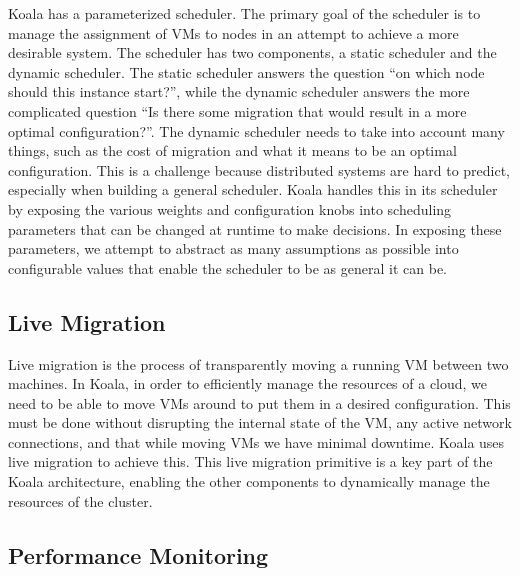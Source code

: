 

Koala has a parameterized scheduler.  The primary goal of the scheduler is to
manage the assignment of VMs to nodes in an attempt to achieve a more desirable
system.  The scheduler has two components, a static scheduler and the dynamic
scheduler.  The static scheduler answers the question ``on which node should
this instance start?'', while the dynamic scheduler answers the more
complicated question ``Is there some migration that would result in a more
optimal configuration?''.  The dynamic scheduler needs to take into account
many things, such as the cost of migration and what it means to be an optimal
configuration.  This is a challenge because distributed systems are hard to
predict, especially when building a general scheduler.  Koala handles this in
its scheduler by exposing the various weights and configuration knobs into
scheduling parameters that can be changed at runtime to make decisions.  In
exposing these parameters, we attempt to abstract as many assumptions as
possible into configurable values that enable the scheduler to be as general it
can be.

\subsection{Live Migration}
Live migration is the process of transparently moving a running VM between two
machines.  In Koala, in order to efficiently manage the resources of a cloud,
we need to be able to move VMs around to put them in a desired configuration.
This must be done without disrupting the internal state of the VM, any active
network connections, and that while moving VMs we have minimal downtime.  Koala
uses live migration to achieve this.  This live migration primitive is a key
part of the Koala architecture, enabling the other components to dynamically
manage the resources of the cluster.

\subsection{Performance Monitoring}


